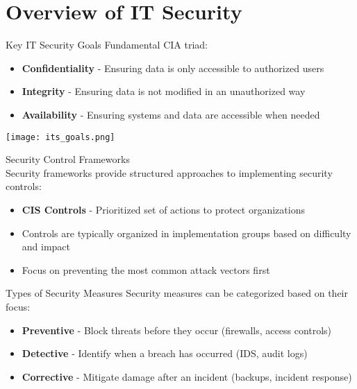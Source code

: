 


\section{Overview of IT Security}


\begin{definition}{Key IT Security Goals}
Fundamental CIA triad:

\begin{minipage}{0.6\linewidth}
\begin{itemize}
    \item \textbf{Confidentiality} - Ensuring data is only accessible to authorized users
    \item \textbf{Integrity} - Ensuring data is not modified in an unauthorized way
    \item \textbf{Availability} - Ensuring systems and data are accessible when needed
\end{itemize}
\end{minipage}
\begin{minipage}{0.4\linewidth}
\texttt{[image: its\_goals.png]}
\end{minipage}
\end{definition}



\raggedcolumns


\begin{concept}{Security Control Frameworks}\\
Security frameworks provide structured approaches to implementing security controls:
\begin{itemize}
    \item \textbf{CIS Controls} - Prioritized set of actions to protect organizations
    \item Controls are typically organized in implementation groups based on difficulty and impact
    \item Focus on preventing the most common attack vectors first
\end{itemize}
\end{concept}

\begin{definition}{Types of Security Measures}
Security measures can be categorized based on their focus:
\begin{itemize}
    \item \textbf{Preventive} - Block threats before they occur (firewalls, access controls)
    \item \textbf{Detective} - Identify when a breach has occurred (IDS, audit logs)
    \item \textbf{Corrective} - Mitigate damage after an incident (backups, incident response)
\end{itemize}
\end{definition}

